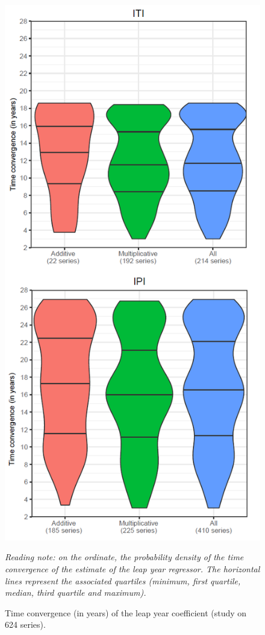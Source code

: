 \documentclass[12pt, a4paper]{article}
\begin{document}
\begin{figure}[!ht]
\begin{center}
 \includegraphics[scale=0.65]{img/LYconvergence2.png}
 \caption[Time convergence (in years) of the leap year coefficient (study on 624 series)]{Time convergence (in years) of the leap year coefficient (study on 624 series).}
 \label{fig:LYconvergence}
\end{center} \vspace{-0.3cm}
\footnotesize
\emph{
Reading note: on the ordinate, the probability density of the time convergence of the estimate of the leap year regressor. The horizontal lines represent the associated quartiles (minimum, first quartile, median, third quartile and maximum).}
\end{figure}
\end{document}
